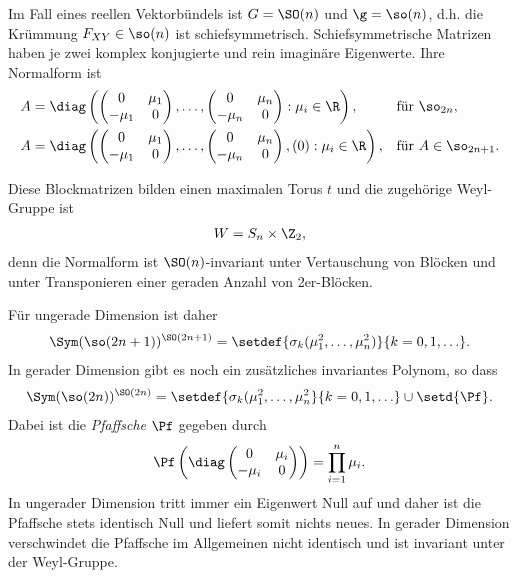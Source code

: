 \documentclass[%
	paper=a5,%
	fleqn,%
	DIV=18,%
	BCOR=0mm,
	fontsize=11pt,
	titlepage=false,%
	bibliography=totoc,
	DIV=18,%
	twoside=true,
	pdftitle=Riemannsche Geometrie,
	pdfauthor=Uwe Semmelmann,
	numbers=noendperiod]%
	{scrbook}
\begin{document}
\begin{rem}
Im Fall eines reellen Vektorbündels ist $G=\SO(n)$ und $\g=\so(n)$, d.h. die Krümmung $F_{XY}\in \so(n)$ ist schiefsymmetrisch. Schiefsymmetrische Matrizen haben je zwei komplex konjugierte und rein imaginäre Eigenwerte. Ihre Normalform ist
\begin{align*}
&A=
\diag\left(
\begin{pmatrix}
0 & \mu_{1}\\
- \mu_{1} & 0
\end{pmatrix}
,\ldots,
\begin{pmatrix}
0 & \mu_{n}\\
- \mu_{n} & 0
\end{pmatrix}
: \mu_{i}\in\R
\right),&& \text{für }\so_{2n},\\
&A=\diag\left(
\begin{pmatrix}
0 & \mu_{1}\\
- \mu_{1} & 0
\end{pmatrix}
,\ldots,
\begin{pmatrix}
0 & \mu_{n}\\
- \mu_{n} & 0
\end{pmatrix},(0) : \mu_{i}\in \R\right),
&& \text{für }A\in\so_{2n+1}.
\end{align*}
\end{rem}
Diese Blockmatrizen bilden einen maximalen Torus $t$ und die zugehörige Weyl-Gruppe ist
\begin{align*}
W = S_{n}\times\Z_{2},
\end{align*}
denn die Normalform ist $\SO(n)$-invariant unter Vertauschung von Blöcken und unter Transponieren einer geraden Anzahl von 2er-Blöcken.


Für ungerade Dimension ist daher
\begin{align*}
\Sym(\so(2n+1))^{\SO(2n+1)} = 
\setdef{\sigma_{k}(\mu_{1}^2,\ldots,\mu_{n}^2)}{k=0,1,\ldots}.
\end{align*}
In gerader Dimension gibt es noch ein zusätzliches invariantes Polynom, so dass
\begin{align*}
\Sym(\so(2n))^{\SO(2n)} = 
\setdef{\sigma_{k}(\mu_{1}^2,\ldots,\mu_{n}^2}{k=0,1,\ldots}\cup
\setd{\Pf}.
\end{align*}
Dabei ist die  \emph{Pfaffsche} $\Pf$ gegeben durch
\begin{align*}
\Pf\left(\diag
\begin{pmatrix}
0 & \mu_{i}\\
-\mu_{i} & 0
\end{pmatrix}
\right) = \prod_{i=1}^n \mu_{i}.
\end{align*}
In ungerader Dimension tritt immer ein Eigenwert Null auf und daher ist die Pfaffsche stets identisch Null und liefert somit nichts neues. In gerader Dimension verschwindet die Pfaffsche im Allgemeinen nicht identisch und ist invariant unter der Weyl-Gruppe.
\end{document}
